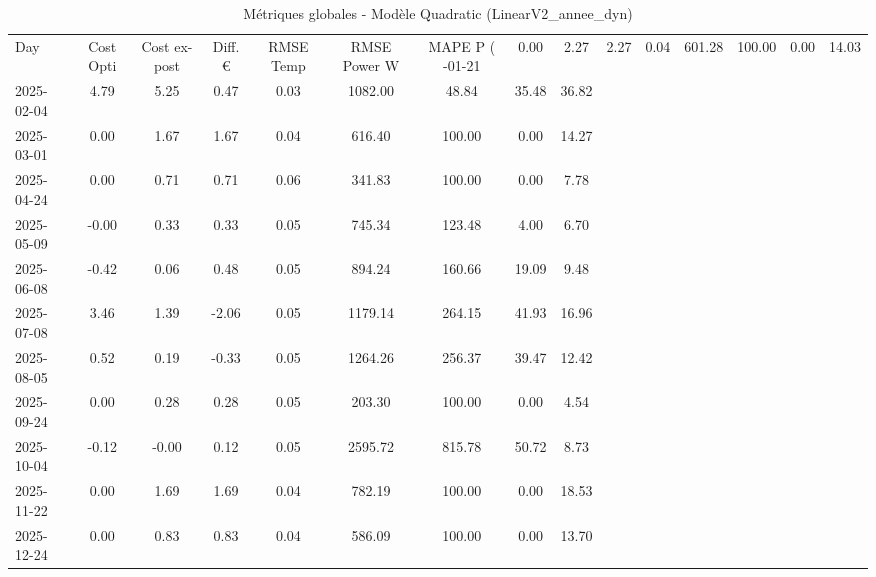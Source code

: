 \begin{table}
\caption{Métriques globales - Modèle Quadratic (LinearV2_annee_dyn)}
\label{tab:Quadratic_LinearV2_annee_dyn_Validation_EPlus_VS_Opti}
\begin{small}
\begin{tabular}{lcccccccc}
\toprule
Day & Cost Opti & Cost ex-post & Diff. € & RMSE Temp & RMSE Power W & MAPE P (%
-01-21 & 0.00 & 2.27 & 2.27 & 0.04 & 601.28 & 100.00 & 0.00 & 14.03 \\
2025-02-04 & 4.79 & 5.25 & 0.47 & 0.03 & 1082.00 & 48.84 & 35.48 & 36.82 \\
2025-03-01 & 0.00 & 1.67 & 1.67 & 0.04 & 616.40 & 100.00 & 0.00 & 14.27 \\
2025-04-24 & 0.00 & 0.71 & 0.71 & 0.06 & 341.83 & 100.00 & 0.00 & 7.78 \\
2025-05-09 & -0.00 & 0.33 & 0.33 & 0.05 & 745.34 & 123.48 & 4.00 & 6.70 \\
2025-06-08 & -0.42 & 0.06 & 0.48 & 0.05 & 894.24 & 160.66 & 19.09 & 9.48 \\
2025-07-08 & 3.46 & 1.39 & -2.06 & 0.05 & 1179.14 & 264.15 & 41.93 & 16.96 \\
2025-08-05 & 0.52 & 0.19 & -0.33 & 0.05 & 1264.26 & 256.37 & 39.47 & 12.42 \\
2025-09-24 & 0.00 & 0.28 & 0.28 & 0.05 & 203.30 & 100.00 & 0.00 & 4.54 \\
2025-10-04 & -0.12 & -0.00 & 0.12 & 0.05 & 2595.72 & 815.78 & 50.72 & 8.73 \\
2025-11-22 & 0.00 & 1.69 & 1.69 & 0.04 & 782.19 & 100.00 & 0.00 & 18.53 \\
2025-12-24 & 0.00 & 0.83 & 0.83 & 0.04 & 586.09 & 100.00 & 0.00 & 13.70 \\
\bottomrule
\end{tabular}
\end{small}
\end{table}
